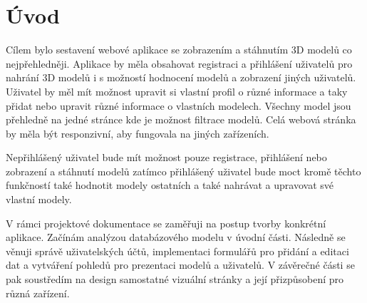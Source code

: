 \documentclass[12pt, a4paper,
twoside,        %
openright
]{report}
\begin{document}

	\setcounter{page}{4} %

	\chapter*{Úvod}
	
Cílem bylo sestavení webové aplikace se zobrazením a stáhnutím 3D modelů co nejpřehledněji. Aplikace by měla obsahovat registraci a přihlášení uživatelů  pro nahrání 3D modelů i s možností hodnocení modelů a zobrazení jiných uživatelů. Uživatel by měl mít možnost upravit si vlastní profil o různé informace a taky přidat nebo upravit různé informace o vlastních modelech. Všechny model jsou přehledně na jedné stránce kde je možnost filtrace modelů. Celá webová stránka by měla být responzivní, aby fungovala na jiných zařízeních.

Nepřihlášený uživatel bude mít možnost pouze registrace, přihlášení nebo zobrazení a stáhnutí modelů zatímco přihlášený uživatel bude moct kromě těchto funkčností také hodnotit modely ostatních a také nahrávat a upravovat své vlastní modely.

V rámci projektové dokumentace se zaměřuji na postup tvorby konkrétní aplikace. Začínám analýzou databázového modelu v úvodní části. Následně se věnuji správě uživatelských účtů, implementaci formulářů pro přidání a editaci dat a vytváření pohledů pro prezentaci modelů a uživatelů. V závěrečné části se pak soustředím na design samostatné vizuální stránky a její přizpůsobení pro různá zařízení.
\end{document}
